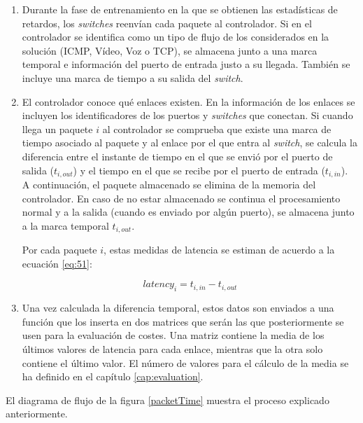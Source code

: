 \documentclass[a4paper,11pt]{book}
\begin{document}
\begin{enumerate}
\item Durante la fase de entrenamiento en la que se obtienen las estadísticas de retardos, los \emph{switches} reenvían cada paquete al controlador. Si en el controlador se identifica como un tipo de flujo de los considerados en la solución (\ac{ICMP}, Vídeo, Voz o \ac{TCP}), se almacena junto a una marca temporal e información del puerto de entrada justo a su llegada. También se incluye una marca de tiempo a su salida del \emph{switch}. 

\item El controlador conoce qué enlaces existen. En la información de los enlaces se incluyen los identificadores de los puertos y \emph{switches} que conectan. Si cuando llega un paquete $i$ al controlador se comprueba que existe una marca de tiempo asociado al paquete y al enlace por el que entra al \emph{switch}, se calcula la diferencia entre el instante de tiempo en el que se envió por el puerto de salida ($t_{i,out}$) y el tiempo en el que se recibe por el puerto de entrada ($t_{i,in}$).  A continuación, el paquete almacenado se elimina de la memoria del controlador. En caso de no estar almacenado se continua el procesamiento normal y a la salida (cuando es enviado por algún puerto), se almacena junto a la marca temporal $t_{i,out}$.

Por cada paquete $i$, estas medidas de latencia se estiman de acuerdo a la ecuación \ref{eq:51}:

\begin{equation}\label{eq:51}
latency_i = t_{i,in} - t_{i,out}
\end{equation}

\item Una vez calculada la diferencia temporal, estos datos son enviados a una función que los inserta en dos matrices que serán las que posteriormente se usen para la evaluación de costes. Una matriz contiene la media de los últimos valores de latencia para cada enlace, mientras que la otra solo contiene el último valor. El número de valores para el cálculo de la media se ha definido en el capítulo \ref{cap:evaluation}.

\end{enumerate}

El diagrama de flujo de la figura \ref{packetTime} muestra el proceso explicado anteriormente.
\end{document}

